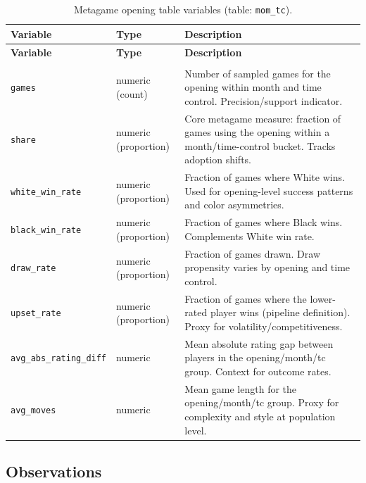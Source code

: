 \documentclass[
  12pt]{article}
\newcommand{\us}{\_\allowbreak}
\begin{document}
\begin{xltabular}{\textwidth}{>{\raggedright\arraybackslash}p{3.2cm} >{\raggedright\arraybackslash}p{2.6cm} X}
\caption{Metagame opening table variables (table: \texttt{mom\us tc}).}\label{tab:variables-metagame-opening}\\
\toprule
\textbf{Variable} & \textbf{Type} & \textbf{Description} \\
\midrule
\endfirsthead

\toprule
\textbf{Variable} & \textbf{Type} & \textbf{Description} \\
\midrule
\endhead

\midrule
{} \\
\endfoot

\bottomrule
\endlastfoot

\texttt{games} & numeric (count) & Number of sampled games for the opening within month and time control. Precision/support indicator. \\
\texttt{share} & numeric (proportion) & Core metagame measure: fraction of games using the opening within a month/time-control bucket. Tracks adoption shifts. \\
\texttt{white\us win\us rate} & numeric (proportion) & Fraction of games where White wins. Used for opening-level success patterns and color asymmetries. \\
\texttt{black\us win\us rate} & numeric (proportion) & Fraction of games where Black wins. Complements White win rate. \\
\texttt{draw\us rate} & numeric (proportion) & Fraction of games drawn. Draw propensity varies by opening and time control. \\
\texttt{upset\us rate} & numeric (proportion) & Fraction of games where the lower-rated player wins (pipeline definition). Proxy for volatility/competitiveness. \\
\texttt{avg\us abs\us rating\us diff} & numeric & Mean absolute rating gap between players in the opening/month/tc group. Context for outcome rates. \\
\texttt{avg\us moves} & numeric & Mean game length for the opening/month/tc group. Proxy for complexity and style at population level. \\
\end{xltabular}

\subsection{Observations}\label{sec-observations}
\end{document}
